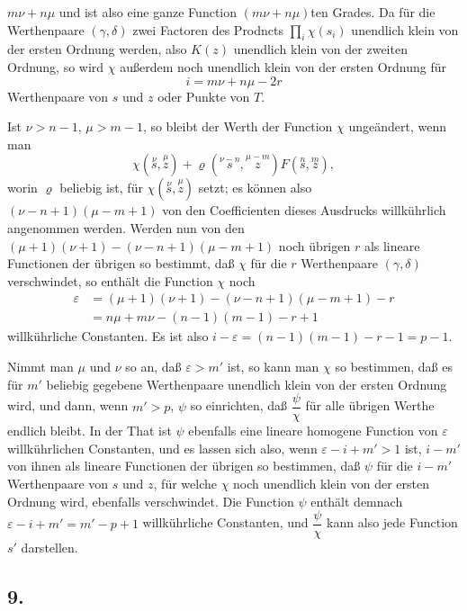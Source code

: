 \documentclass{article}
\begin{document}
$m\nu + n\mu$ und ist also eine ganze Function $(m\nu + n\mu)$ten Grades. Da für die Werthenpaare $(\gamma, \delta)$ zwei Factoren des Prodncts $\displaystyle\prod_{i} \chi(s_{i})$ unendlich klein von der ersten Ordnung werden, also $K(z)$ unendlich klein von der zweiten Ordnung, so wird $\chi$ außerdem noch unendlich klein von der ersten Ordnung für
\[ i = m\nu + n\mu - 2r \]
Werthenpaare von $s$ und $z$ oder Punkte von $T$.

Ist $\nu > n-1$, $\mu > m-1$, so bleibt der Werth der Function $\chi$ ungeändert, wenn man
\[ \chi(\overset{\nu}{s}, \overset{\mu}{z}) + \varrho(\overset{\nu-n}{s}, \overset{\mu-m}{z}) F(\overset{n}{s}, \overset{m}{z}), \]
worin $\varrho$ beliebig ist, für $\chi(\overset{\nu}{s}, \overset{\mu}{z})$ setzt; es können also $(\nu-n+1)(\mu-m+1)$ von den Coefficienten dieses Ausdrucks willkührlich angenommen werden. Werden nun von den $(\mu+1)(\nu+1) - (\nu-n+1)(\mu-m+1)$ noch übrigen $r$ als lineare Functionen der übrigen so bestimmt, daß $\chi$ für die $r$ Werthenpaare $(\gamma, \delta)$ verschwindet, so enthält die Function $\chi$ noch
\[
\begin{aligned}
\varepsilon &= (\mu+1)(\nu+1) - (\nu-n+1)(\mu-m+1) - r \\
&= n\mu + m\nu - (n-1)(m-1) - r + 1
\end{aligned}
\]
willkührliche Constanten. Es ist also $i - \varepsilon = (n-1)(m-1) - r - 1 = p-1$.

Nimmt man $\mu$ und $\nu$ so an, daß $\varepsilon > m'$ ist, so kann man $\chi$ so bestimmen, daß es für $m'$ beliebig gegebene Werthenpaare unendlich klein von der ersten Ordnung wird, und dann, wenn $m' > p$, $\psi$ so einrichten, daß $\dfrac{\psi}{\chi}$ für alle übrigen Werthe endlich bleibt. In der That ist $\psi$ ebenfalls eine lineare homogene Function von $\varepsilon$ willkührlichen Constanten, und es lassen sich also, wenn $\varepsilon - i + m' > 1$ ist, $i - m'$ von ihnen als lineare Functionen der übrigen so bestimmen, daß $\psi$ für die $i - m'$ Werthenpaare von $s$ und $z$, für welche $\chi$ noch unendlich klein von der ersten Ordnung wird, ebenfalls verschwindet. Die Function $\psi$ enthält demnach $\varepsilon - i + m' = m' - p + 1$ willkührliche Constanten, und $\dfrac{\psi}{\chi}$ kann also jede Function $s'$ darstellen.

\subsection*{9.}
\end{document}
